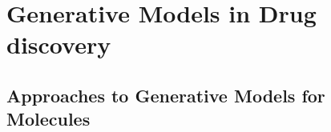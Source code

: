 



\section{Generative Models in Drug discovery\label{sec:generative-models}}

\subsection{Approaches to Generative Models for Molecules}
